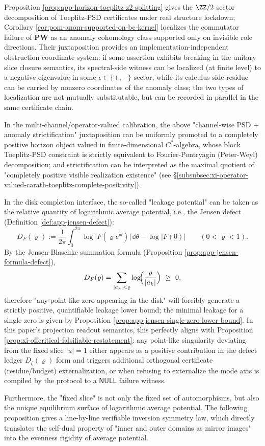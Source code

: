 \begin{remark}\label{rem:xi-toeplitz-z2-anom-alignment}
Proposition \ref{prop:app-horizon-toeplitz-z2-splitting} gives the \(\ZZ/2\) sector decomposition of Toeplitz-PSD certificates under real structure lockdown;
Corollary \ref{cor:pom-anom-supported-on-bc-kernel} localizes the commutator failure of \(\mathbf{PW}\) as an anomaly cohomology class supported only on invisible role directions.
Their juxtaposition provides an implementation-independent obstruction coordinate system: if some assertion exhibits breaking in the unitary slice closure semantics, its spectral-side witness can be localized (at finite level) to a negative eigenvalue in some \(\epsilon\in\{+,-\}\) sector, while its calculus-side residue can be carried by nonzero coordinates of the anomaly class;
the two types of localization are not mutually substitutable, but can be recorded in parallel in the same certificate chain.
\par
In the multi-channel/operator-valued calibration, the above "channel-wise PSD + anomaly strictification" juxtaposition can be uniformly promoted to a completely positive horizon object valued in finite-dimensional \(C^\ast\)-algebra, whose block Toeplitz-PSD constraint is strictly equivalent to Fourier-Pontryagin (Peter-Weyl) decomposition; and strictification can be interpreted as the maximal quotient of "completely positive visible realization existence" (see \S\ref{subsubsec:xi-operator-valued-carath-toeplitz-complete-positivity}).
\end{remark}
In the disk completion interface, the so-called "leakage potential" can be taken as the relative quantity of logarithmic average potential, i.e., the Jensen defect (Definition \ref{def:app-jensen-defect}):
\[
D_F(\varrho)
:=\frac{1}{2\pi}\int_{0}^{2\pi}\log\bigl|F(\varrho e^{\mathrm{i}\theta})\bigr|\,\dd\theta
-\log|F(0)|
\qquad(0<\varrho<1).
\]
By the Jensen-Blaschke summation formula (Proposition \ref{prop:app-jensen-formula-defect}),
\[
D_F(\varrho)=\sum_{|a_k|<\varrho}\log\!\Bigl(\frac{\varrho}{|a_k|}\Bigr)\ \ge\ 0,
\]
therefore "any point-like zero appearing in the disk" will forcibly generate a strictly positive, quantifiable leakage lower bound;
the minimal leakage for a single zero is given by Proposition \ref{prop:app-jensen-single-zero-lower-bound}.
In this paper's projection readout semantics, this perfectly aligns with Proposition \ref{prop:xi-offcritical-falsifiable-restatement}: any point-like singularity deviating from the fixed slice \(|u|=1\) either appears as a positive contribution in the defect ledger \(D_\zeta(\varrho)\) form and triggers additional orthogonal certificate (residue/budget) externalization, or when refusing to externalize the mode axis is compiled by the protocol to a \(\mathsf{NULL}\) failure witness.
\par
Furthermore, the "fixed slice" is not only the fixed set of automorphisms, but also the unique equilibrium surface of logarithmic average potential.
The following proposition gives a line-by-line verifiable inversion symmetry law, which directly translates the self-dual property of "inner and outer domains as mirror images" into the evenness rigidity of average potential.

